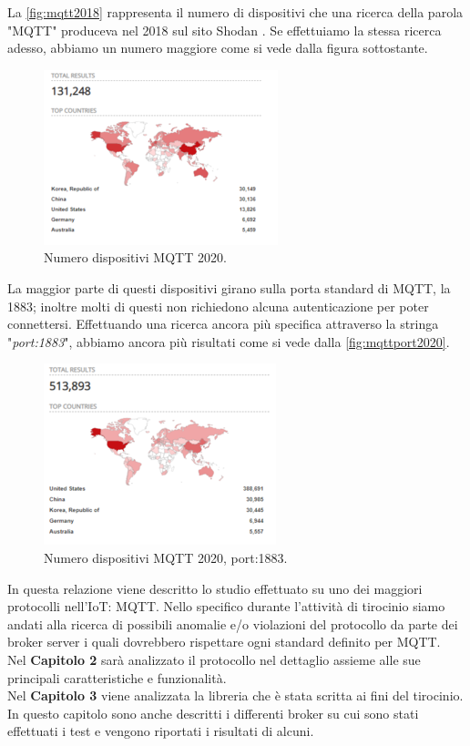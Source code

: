 \documentclass[binding=0.6cm,TFA]{sapthesis}
\begin{document}
\begin{large}
La \autoref{fig:mqtt2018} rappresenta il numero di dispositivi che una ricerca della parola "MQTT" produceva nel 2018 sul sito Shodan \cite{articleAvast}.
Se effettuiamo la stessa ricerca adesso, abbiamo un numero maggiore come si vede dalla figura sottostante.

\begin{figure}[h]
\centering
\includegraphics[scale=0.8]{images/mqtt-2020numbers.png}
\caption{Numero dispositivi MQTT 2020.}
\label{fig:mqtt2020}
\end{figure}

La maggior parte di questi dispositivi girano sulla porta standard di MQTT, la 1883; inoltre molti di questi non richiedono alcuna autenticazione per poter connettersi. Effettuando una ricerca ancora più specifica attraverso la stringa "\textit{port:1883}", abbiamo ancora più risultati come si vede dalla \autoref{fig:mqttport2020}.\\

\begin{figure}[h]
\centering
\includegraphics[scale=0.8]{images/mqtt-2020port.png}
\caption{Numero dispositivi MQTT 2020, port:1883.}
\label{fig:mqttport2020}
\end{figure}

In questa relazione viene descritto lo studio effettuato su uno dei maggiori protocolli nell'IoT: MQTT. Nello specifico durante l'attività di tirocinio siamo andati alla ricerca di possibili anomalie e/o violazioni del protocollo da parte dei broker server i quali dovrebbero rispettare ogni standard definito per MQTT. \\

Nel \textbf{Capitolo 2} sarà analizzato il protocollo nel dettaglio assieme alle sue principali caratteristiche e funzionalità. \\

Nel \textbf{Capitolo 3} viene analizzata la libreria che è stata scritta ai fini del tirocinio. In questo capitolo sono anche descritti i differenti broker su cui sono stati effettuati i test e vengono riportati i risultati di alcuni.

\end{large}
\end{document}
